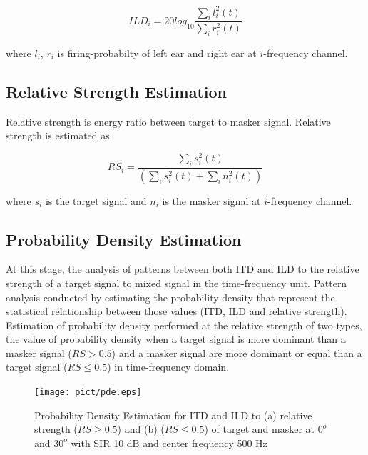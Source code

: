 \documentclass[a4paper]{jpconf}
\begin{document}
\begin{equation}\label{pers:ild}
ILD_i = 20log_{10}\frac{\sum_i l_i^2(t)}{\sum_i r_i^2(t)}
\end{equation}

where $l_i$, $r_i$ is firing-probabilty of left ear and right ear at $i$-frequency channel.

\subsection{Relative Strength Estimation}
Relative strength is energy ratio between target to masker signal. Relative strength is estimated as

\begin{equation}
RS_i = \frac{\sum_i s_i^2(t)}{\left(\sum_i s_i^2(t) + \sum_i n_i^2(t)\right)}
\end{equation}

where $s_i$ is the target signal and $n_i$ is the masker signal at $i$-frequency channel.

\subsection{Probability Density Estimation}
At this stage, the analysis of patterns between both ITD and ILD to the relative strength of a target signal to mixed signal in the time-frequency unit. Pattern analysis conducted by estimating the probability density that represent the statistical relationship between those values (ITD, ILD and relative strength). Estimation of probability density performed at the relative strength of two types, the value of probability density when a target signal is more dominant than a masker signal ($RS > 0.5$) and a masker signal are more dominant or equal than a target signal ($RS \leq 0.5$) in time-frequency domain.


\begin{figure}[h]
    \centering
    \texttt{[image: pict/pde.eps]}
    \caption{\label{pict:pde}Probability Density Estimation for ITD and ILD to (a) relative strength ($RS \ge 0.5$) and (b) ($RS \leq 0.5$) of target and masker at $0^o$ and $30^o$ with SIR 10 dB and center frequency 500 Hz}
\end{figure} 
\end{document}
